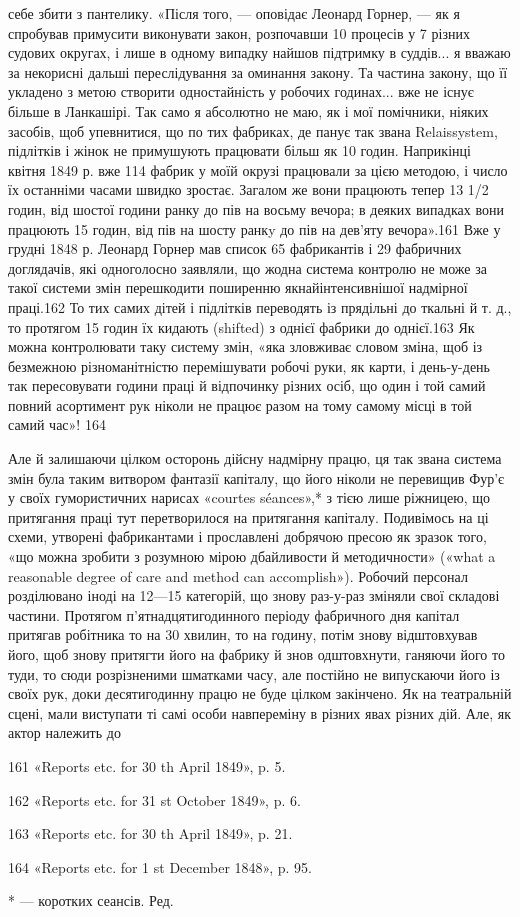 себе збити з пантелику. «Після того, — оповідає Леонард Горнер, —
як я спробував примусити виконувати закон, розпочавши 10 процесів
у 7 різних судових округах, і лише в одному випадку найшов
підтримку в суддів... я вважаю за некорисні дальші переслідування
за оминання закону. Та частина закону, що її укладено
з метою створити одностайність у робочих годинах... вже не існує
більше в Ланкашірі. Так само я абсолютно не маю, як і мої помічники,
ніяких засобів, щоб упевнитися, що по тих фабриках, де
панує так звана Relaissystem, підлітків і жінок не примушують
працювати більш як 10 годин. Наприкінці квітня 1849 р. вже
114 фабрик у моїй окрузі працювали за цією методою, і число
їх останніми часами швидко зростає. Загалом же вони працюють
тепер 13 1/2 годин, від шостої години ранку до пів на восьму вечора;
в деяких випадках вони працюють 15 годин, від пів на шосту
ранкy до пів на дев’яту вечора».161 Вже у грудні 1848 р. Леонард
Горнер мав список 65 фабрикантів і 29 фабричних доглядачів,
які одноголосно заявляли, що жодна система контролю не може
за такої системи змін перешкодити поширенню якнайінтенсивнішої
надмірної праці.162 То тих самих дітей і підлітків переводять
із прядільні до ткальні й т. д., то протягом 15 годин їх
кидають (shifted) з однієї фабрики до однієї.163 Як можна контролювати
таку систему змін, «яка зловживає словом зміна, щоб із
безмежною різноманітністю перемішувати робочі руки, як карти,
і день-у-день так пересовувати години праці й відпочинку
різних осіб, що один і той самий повний асортимент рук ніколи
не працює разом на тому самому місці в той самий час»! 164

Але й залишаючи цілком осторонь дійсну надмірну працю,
ця так звана система змін була таким витвором фантазії капіталу,
що його ніколи не перевищив Фур’є у своїх гумористичних
нарисах «courtes séances»,* з тією лише ріжницею, що притягання
праці тут перетворилося на притягання капіталу. Подивімось
на ці схеми, утворені фабрикантами і прославлені добрячою
пресою як зразок того, «що можна зробити з розумною мірою
дбайливости й методичности» («what a reasonable degree of care
and method can accomplish»). Робочий персонал розділювано
іноді на 12—15 категорій, що знову раз-у-раз зміняли свої
складові частини. Протягом п’ятнадцятигодинного періоду фабричного
дня капітал притягав робітника то на 30 хвилин, то на
годину, потім знову відштовхував його, щоб знову притягти
його на фабрику й знов одштовхнути, ганяючи його то туди, то сюди
розрізненими шматками часу, але постійно не випускаючи його
із своїх рук, доки десятигодинну працю не буде цілком закінчено.
Як на театральній сцені, мали виступати ті самі особи навпереміну
в різних явах різних дій. Але, як актор належить до

161 «Reports etc. for 30 th April 1849», p. 5.

162 «Reports etc. for 31 st October 1849», p. 6.

163 «Reports etc. for 30 th April 1849», p. 21.

164 «Reports etc. for 1 st December 1848», p. 95.

* — коротких сеансів. Ред.
